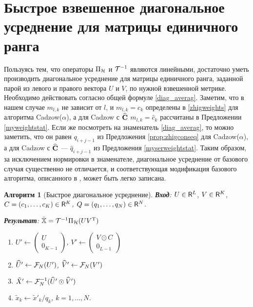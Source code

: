 \documentclass[12pt, specialist, subf,href,colorlinks=true,substylefile = spbu.rtx]{disser}
\newtheorem{algorithm}{Алгоритм}
\theoremstyle{remark}
\theoremstyle{definition}
\begin{document}
\section{Быстрое взвешенное диагональное усреднение для матрицы единичного ранга}
Пользуясь тем, что операторы $\Pi_{\mathcal{H}}$ и $\mathcal{T}^{-1}$ являются линейными, достаточно уметь производить диагональное усреднение для матрицы единичного ранга, заданной парой из левого и правого вектора $U$ и $V$, по нужной взвешенной метрике. Необходимо действовать согласно общей формуле \eqref{diag_averag}. Заметим, что в нашем случае $m_{l,k}$ не зависит от $l$, и $m_{l,k} = c_k$ определены в \eqref{zhigweights} для алгоритма Cadzow($\alpha$), а для Cadzow с $\widehat {\mathbf{C}}$ $m_{l,k} = \hat c_k$ рассчитаны в Предложении \ref{myweightstat}. Если же посмотреть на знаменатель \eqref{diag_averag}, то можно заметить, что он равен $q_{i+j-1}$ из Предложения \ref{prop:zhigconseq} для Cadzow($\alpha$), а для Cadzow с $\widehat {\mathbf{C}}$ --- $\hat q_{i+j-1}$ из Предложения \ref{myserweightstat}. Таким образом, за исключением нормировки в знаменателе, диагональное усреднение от базового случая существенно не отличается, и соответствующая модификация базового алгоритма, описанного в \cite{Golyandina2013}, может быть легко записана.
\begin{algorithm}[Быстрое диагональное усреднение]
	\textbf{Вход}: $U \in \mathsf{R}^L$, $V \in \mathsf{R}^K$, $C = (c_1, \ldots, c_K) \in \mathsf{R}^K$, $Q = (q_1, \ldots, q_N) \in \mathsf{R}^N$.
	
	\textbf{Результат}:
	$\tilde {\mathbb{X}} = \mathcal{T}^{-1}\Pi_{\mathcal{H}}(U V^{\mathrm{T}})$
	
	\begin{enumerate}
		\item
		$U' \leftarrow \begin{pmatrix}
		U \\ 
		0_{K-1}
		\end{pmatrix} $, $V' \leftarrow \begin{pmatrix}
		V \odot C \\ 
		0_{L-1}
		\end{pmatrix} $
		\item
		$\widehat U' \leftarrow \mathcal{F}_N(U')$, $\widehat V' \leftarrow \mathcal{F}_N(V')$
		\item
		$\tilde X' \leftarrow \mathcal{F}^{-1}_N (\widehat U' \odot \widehat V')$
		\item
		$\tilde x_k \leftarrow \tilde x'_k/q_k$, $k = 1, \ldots, N$.
	\end{enumerate}
\end{algorithm}
\end{document}
